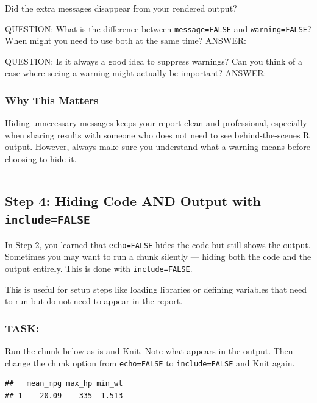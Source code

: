 \documentclass[
]{article}
\begin{document}
Did the extra messages disappear from your rendered output?

QUESTION: What is the difference between \texttt{message=FALSE} and
\texttt{warning=FALSE}? When might you need to use both at the same
time? ANSWER:

QUESTION: Is it always a good idea to suppress warnings? Can you think
of a case where seeing a warning might actually be important? ANSWER:

\subsubsection{Why This Matters}\label{why-this-matters-1}

Hiding unnecessary messages keeps your report clean and professional,
especially when sharing results with someone who does not need to see
behind-the-scenes R output. However, always make sure you understand
what a warning means before choosing to hide it.

\begin{center}\rule{0.5\linewidth}{0.5pt}\end{center}

\subsection{\texorpdfstring{Step 4: Hiding Code AND Output with
\texttt{include=FALSE}}{Step 4: Hiding Code AND Output with include=FALSE}}\label{step-4-hiding-code-and-output-with-includefalse}

In Step 2, you learned that \texttt{echo=FALSE} hides the code but still
shows the output. Sometimes you may want to run a chunk silently ---
hiding both the code and the output entirely. This is done with
\texttt{include=FALSE}.

This is useful for setup steps like loading libraries or defining
variables that need to run but do not need to appear in the report.

\subsubsection{TASK:}\label{task-10}

Run the chunk below as-is and Knit. Note what appears in the output.
Then change the chunk option from \texttt{echo=FALSE} to
\texttt{include=FALSE} and Knit again.

\begin{verbatim}
##   mean_mpg max_hp min_wt
## 1    20.09    335  1.513
\end{verbatim}
\end{document}
